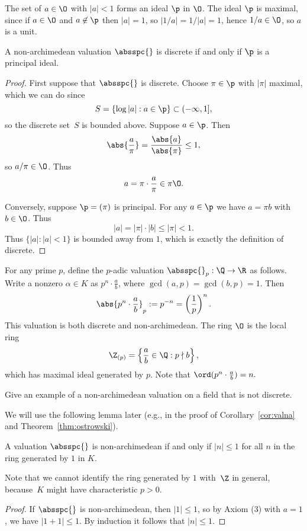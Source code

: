 \documentclass[11pt]{book}
\begin{document}
\begin{ch}
The set of $a\in \O$ with $|a|<1$ forms an ideal $\p$ in $\O$.  The
ideal $\p$ is maximal, since if $a\in\O$ and $a\not\in\p$ then
$|a|=1$, so $|1/a| = 1/|a| = 1$, hence $1/a\in \O$, so $a$ is a unit.

\begin{lemma}\label{lem:discrete_principal}
A non-archimedean valuation $\absspc{}$ is
discrete if and only if $\p$ is a principal ideal.
\end{lemma}
\begin{proof}
First suppose that $\absspc{}$ is discrete.
Choose $\pi \in \p$ with $|\pi|$ maximal, which
we can do since
$$
  S=\{\log|a| : a \in \p\} \subset (-\infty,1],
$$
so the discrete set~$S$ is bounded above.
Suppose $a\in \p$.   Then
$$
  \abs{\frac{a}{\pi}} = \frac{\abs{a}}{\abs{\pi }} \leq 1,
$$
so $a/\pi\in \O$.
Thus $$a = \pi \cdot \frac{a}{\pi} \in \pi \O.$$

Conversely, suppose $\p=(\pi)$ is principal.  For any $a\in \p$
we have $a=\pi b$ with $b\in\O$.  Thus
$$
  |a| = |\pi|\cdot |b| \leq |\pi| < 1.
$$
Thus $\{|a| : |a|<1\}$ is bounded away from $1$,
which is exactly the definition of discrete.
\end{proof}

\begin{example}\label{ex:padic_valuation}
For any prime $p$, define the $p$-adic valuation
$\absspc{}_p:\Q\to\R$ as follows.  Write a nonzero $\alpha\in K$
as $p^n\cdot \frac{a}{b}$, where $\gcd(a,p)=\gcd(b,p)=1$.  Then
$$\abs{p^n\cdot \frac{a}{b}}_p := p^{-n} = \left(\frac{1}{p}\right)^{n}.$$
This valuation is both discrete and non-archimedean.
The ring $\O$ is the local ring
$$
  \Z_{(p)} = \left\{\frac{a}{b}\in\Q : p\nmid b\right\},
$$
which has maximal ideal generated by $p$.  Note that
$\ord(p^n\cdot \frac{a}{b}) = n.$
\end{example}

\begin{exercise} \label{ex:valuations1}
Give an example of a non-archimedean valuation on a field that
is not discrete.
\end{exercise}

We will use the following lemma later (e.g., in
the proof of Corollary~\ref{cor:valna} and Theorem~\ref{thm:ostrowski}).
\begin{lemma}\label{lem:nonarch}
  A valuation $\absspc{}$ is non-archimedean if and only if $|n|\leq
  1$ for all $n$ in the ring generated by $1$ in $K$.
\end{lemma}
Note that we cannot identify the ring generated by $1$ with~$\Z$
in general, because~$K$ might have characteristic $p>0$.
\begin{proof}
If $\absspc{}$ is non-archimedean, then $|1|\leq 1$,
so by Axiom (3) with $a=1$, we have  $|1+1|\leq 1$.  By
induction it follows that $|n|\leq 1$.


\end{proof}
\end{ch}
\end{document}
